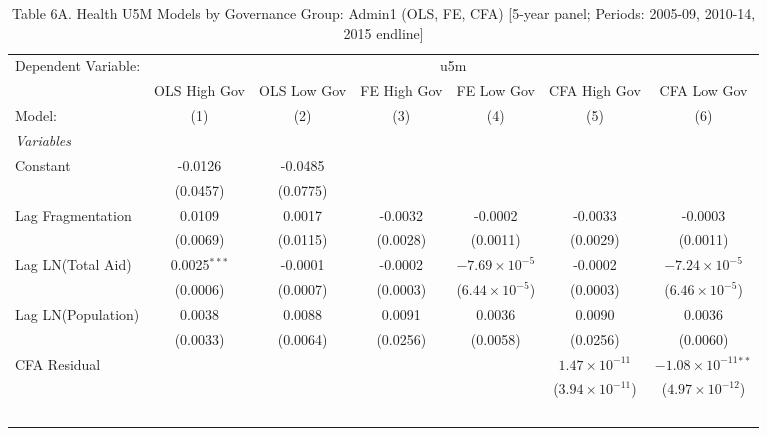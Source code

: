 
\begin{table}[H]
   \caption{Table 6A. Health U5M Models by Governance Group: Admin1 (OLS, FE, CFA) [5-year panel; Periods: 2005-09, 2010-14, 2015 endline]}
   \centering
   \begin{tabular}{lcccccc}
      \tabularnewline \midrule \midrule
      Dependent Variable: & \multicolumn{6}{c}{u5m}\\
                         & OLS High Gov   & OLS Low Gov & FE High Gov & FE Low Gov              & CFA High Gov             & CFA Low Gov \\   
      Model:             & (1)            & (2)         & (3)         & (4)                     & (5)                      & (6)\\  
      \midrule
      \emph{Variables}\\
      Constant           & -0.0126        & -0.0485     &             &                         &                          &   \\   
                         & (0.0457)       & (0.0775)    &             &                         &                          &   \\   
      Lag Fragmentation  & 0.0109         & 0.0017      & -0.0032     & -0.0002                 & -0.0033                  & -0.0003\\   
                         & (0.0069)       & (0.0115)    & (0.0028)    & (0.0011)                & (0.0029)                 & (0.0011)\\   
      Lag LN(Total Aid)  & 0.0025$^{***}$ & -0.0001     & -0.0002     & $-7.69\times 10^{-5}$   & -0.0002                  & $-7.24\times 10^{-5}$\\    
                         & (0.0006)       & (0.0007)    & (0.0003)    & ($6.44\times 10^{-5}$)  & (0.0003)                 & ($6.46\times 10^{-5}$)\\    
      Lag LN(Population) & 0.0038         & 0.0088      & 0.0091      & 0.0036                  & 0.0090                   & 0.0036\\   
                         & (0.0033)       & (0.0064)    & (0.0256)    & (0.0058)                & (0.0256)                 & (0.0060)\\   
      CFA Residual       &                &             &             &                         & $1.47\times 10^{-11}$    & $-1.08\times 10^{-11}$$^{**}$\\    
                         &                &             &             &                         & ($3.94\times 10^{-11}$)  & ($4.97\times 10^{-12}$)\\    
$$
\end{tabular}
\end{table}
